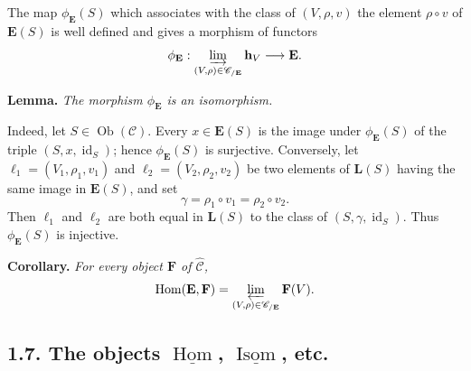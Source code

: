 The map \(\phi_{\mathbf E}(S)\) which associates with the class of
\((V,\rho,v)\) the element \(\rho\circ v\) of \(\mathbf E(S)\) is well
defined and gives a morphism of functors
\[
  \phi_{\mathbf E}:
  \varinjlim_{(V,\rho)\in\mathscr C_{/\mathbf E}}\mathbf h_V
    \longrightarrow\mathbf E.
\]

\medskip
\noindent\textbf{Lemma.}
\textit{The morphism \(\phi_{\mathbf E}\) is an isomorphism.}

Indeed, let \(S\in\operatorname{Ob}(\mathscr C)\). Every
\(x\in\mathbf E(S)\) is the image under \(\phi_{\mathbf E}(S)\) of the
triple \((S,x,\operatorname{id}_S)\); hence \(\phi_{\mathbf E}(S)\) is
surjective. Conversely, let
\(\ell_1=(V_1,\rho_1,v_1)\) and
\(\ell_2=(V_2,\rho_2,v_2)\) be two elements of \(\mathbf L(S)\) having
the same image in \(\mathbf E(S)\), and set
\[
  \gamma=\rho_1\circ v_1=\rho_2\circ v_2.
\]
Then \(\ell_1\) and \(\ell_2\) are both equal in \(\mathbf L(S)\) to the
class of \((S,\gamma,\operatorname{id}_S)\). Thus
\(\phi_{\mathbf E}(S)\) is injective.

\medskip
\noindent\textbf{Corollary.}
\textit{For every object \(\mathbf F\) of \(\widehat{\mathscr C}\),
\[
  \operatorname{Hom}(\mathbf E,\mathbf F)
    =\varprojlim_{(V,\rho)\in\mathscr C_{/\mathbf E}}\mathbf F(V).
\]}

\subsection*{1.7. The objects \(\underline{\operatorname{Hom}}\),
\(\underline{\operatorname{Isom}}\), etc.}

